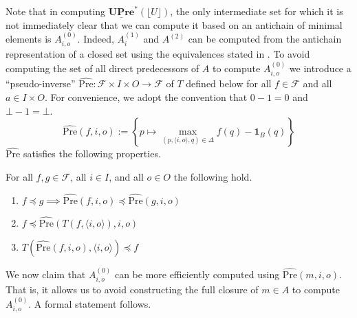 \documentclass[runningheads,a4paper,draft]{llncs}
\newcommand{\indicator}[2]{\mathbf{1}_{#1}(#2)}
\newcommand{\upre}{\mathbf{UPre}}
\newcommand{\calF}{\mathcal{F}}
\newcommand{\pseudopre}{\widehat{\mathrm{Pre}}}
\begin{document}
Note that in computing $\underline{\upre}^*(\lfloor U \rfloor)$, the only
intermediate set for which it is not immediately clear that we can compute it
based on an antichain of minimal elements is $A^{(0)}_{i,o}$. Indeed,
$A^{(1)}_i$ and $A^{(2)}$ can be computed from the antichain representation of
a closed set using the equivalences stated in . To avoid
computing the set of all direct predecessors of $A$ to compute $A^{(0)}_{i,o}$
we introduce a ``pseudo-inverse'' $\pseudopre : \calF \times I \times O \to
\calF$ of $T$ defined below for all $f \in \calF$ and all $a \in I \times
O$. For convenience, we adopt the convention that $0 - 1 = 0$ and
$\bot - 1 = \bot$.
\[
  \pseudopre(f,i,o) := \left\{ p \mapsto
    \max_{(p,\langle i, o \rangle,q) \in \Delta} f(q) -
    \indicator{B}{q} \right\}
\]
$\pseudopre$ satisfies the following properties.
\begin{lemma}\label{lem:order-pseudopre}
  For all $f,g \in \calF$, all $i \in I$, and all $o \in O$
  the following hold.
  \begin{enumerate}
    \item $f \preceq g \implies \pseudopre(f,i,o) \preceq \pseudopre(g,i,o)$
      \label{itm:order-pre}
    \item $f \preceq \pseudopre(T(f,\langle i, o \rangle),i,o)$
      \label{itm:order-postpre}
    \item $T(\pseudopre(f,i,o), \langle i, o \rangle) \preceq f$
      \label{itm:order-prepost}
  \end{enumerate}
\end{lemma}

We now claim that $A^{(0)}_{i,o}$ can be more efficiently computed using
$\pseudopre(m,i,o)$. That is, it allows us to avoid constructing the full
closure of $m \in A$ to compute $A^{(0)}_{i,o}$. A formal statement follows.
\end{document}
